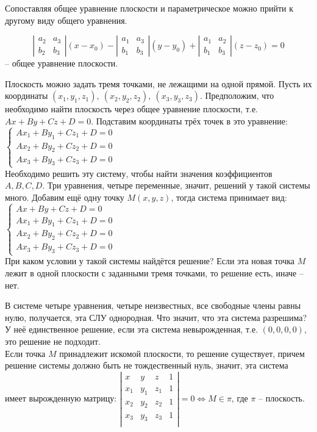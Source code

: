 	Сопоставляя общее уравнение плоскости и параметрическое можно прийти к другому виду общего уравнения.

	\begin{Def}
		$$\left|\begin{array}{cccc}
			a_2 & a_3 \\ 
			b_2 & b_3
			\end{array}\right| (x-x_0) - 
		\left|\begin{array}{cccc}
			a_1 & a_3 \\ 
			b_1 & b_3
			\end{array}\right| (y- y_0) + 
		\left|\begin{array}{cccc}
			a_1 & a_2 \\ 
			b_1 & b_3
			\end{array}\right| (z-z_0) = 0$$ -- общее уравнение плоскости.
	\end{Def}

	Плоскость можно задать тремя точками, не лежащими на одной прямой. Пусть их координаты $(x_1, y_1, z_1), \ (x_2, y_2, z_2), \ (x_3, y_3, z_3)$. Предположим, что необходимо найти плоскость через общее уравнение плоскости, т.е. $Ax + By + Cz + D = 0$. Подставим координаты трёх точек в это уравнение:
	$ \begin{cases}
		Ax_1 + By_1 + Cz_1 + D = 0\\
		Ax_2 + By_2 + Cz_2 + D = 0\\
		Ax_3 + By_3 + Cz_3 + D = 0
	\end{cases} $ \\
	Необходимо решить эту систему, чтобы найти значения коэффициентов $A, B, C, D$. Три уравнения, четыре переменные, значит, решений у такой системы много.
	Добавим ещё одну точку $M(x, y, z)$, тогда система принимает вид:
	$ \begin{cases}
		Ax + By + Cz + D = 0 \\
		Ax_1 + By_1 + Cz_1 + D = 0\\
		Ax_2 + By_2 + Cz_2 + D = 0\\
		Ax_3 + By_3 + Cz_3 + D = 0
	\end{cases} $ \\
	При каком условии у такой системы найдётся решение? Если эта новая точка $M$ лежит в одной плоскости с заданными тремя точками, то решение есть, иначе -- нет.

	В системе четыре уравнения, четыре неизвестных, все свободные члены равны нулю, получается, эта СЛУ однородная. Что значит, что эта система разрешима? У неё единственное решение, если эта система невырожденная, т.е. $(0, 0, 0, 0)$, это решение не подходит. \\
	Если точка $M$ принадлежит искомой плоскости, то решение существует, причем решение системы должно быть не тождественный нуль, значит, эта система имеет вырожденную матрицу:
	$\left|\begin{array}{cccc}
		x & y & z & 1 \\ 
		x_1 & y_1 & z_1 & 1 \\
		x_2 & y_2 & z_2 & 1 \\
		x_3 & y_3 & z_3 & 1 \\
		\end{array}\right| = 0 \Leftrightarrow M \in \pi$, где $\pi$ -- плоскость.

